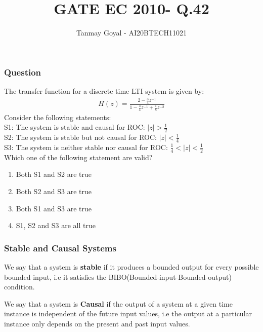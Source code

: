 \documentclass{beamer}
\title{GATE EC 2010- Q.42}
\author{Tanmay Goyal - AI20BTECH11021}
\date{}
\providecommand{\abs}[1]{\left\vert#1\right\vert}
\begin{document}
\begin{frame}
\titlepage
\end{frame}
\begin{frame}
\frametitle{Question}
\begin{flushleft}
The transfer function for a discrete time LTI system is given by:
\begin{align}
    H(z) = \frac{2 - \frac{3}{4}z^{-1}}{1 - \frac{3}{4}z^{-1} + \frac{1}{8}z^{-2}}
\end{align}
Consider the following statements:\\
S1: The system is stable and causal for ROC: $\abs{z} > \frac{1}{2}$\\
S2: The system is stable but not causal for ROC:  $\abs{z} < \frac{1}{4}$\\
S3: The system is neither stable nor causal for ROC:  $\frac{1}{4}<\abs{z} < \frac{1}{2}$\\
Which one of the following statement are valid?
\begin{enumerate}
    \item Both S1 and S2 are true
    \item Both S2 and S3 are true
    \item Both S1 and S3 are true
    \item S1, S2 and S3 are all true
\end{enumerate}
\end{flushleft}
\end{frame}

\begin{frame}[fragile]
\frametitle{Stable and Causal Systems}

\begin{flushleft}
\begin{definition}
We say that a system is \textbf{stable} if it produces a bounded output for every possible bounded input, i.e it satisfies the BIBO(Bounded-input-Bounded-output) condition.
\end{definition}
          \end{flushleft}
    \begin{flushleft}
    \begin{definition}
We say that a system is \textbf{Causal} if the output of a system at a given time instance is independent of the future input values, i.e the output at a particular instance only depends on the present and past input values.

\end{definition}
\end{flushleft}
\end{frame}
\end{document}
